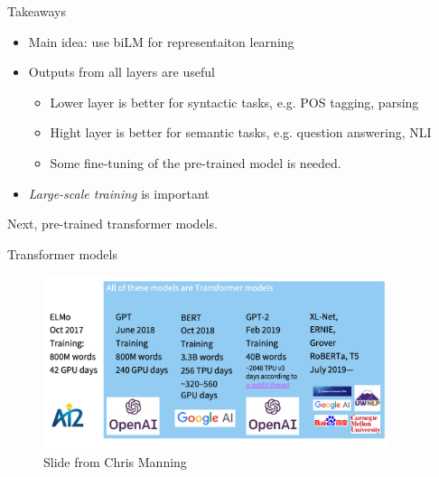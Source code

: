 \documentclass[usenames,dvipsnames,notes]{beamer}
\begin{document}
\begin{frame}
    {Takeaways}
    \begin{itemize}
        \item Main idea: use biLM for representaiton learning
        \item Outputs from all layers are useful
            \begin{itemize}
                \item Lower layer is better for syntactic tasks, e.g. POS tagging, parsing
                \item Hight layer is better for semantic tasks, e.g. question answering, NLI
                \item Some fine-tuning of the pre-trained model is needed.
            \end{itemize}
        \item \emph{Large-scale training} is important
    \end{itemize}
    Next, pre-trained transformer models.
\end{frame}

\begin{frame}
    {Transformer models}
    \begin{figure}
        \includegraphics[width=0.9\textwidth]{figures/transformers}
        \caption{Slide from Chris Manning}
    \end{figure}
\end{frame}
\end{document}
